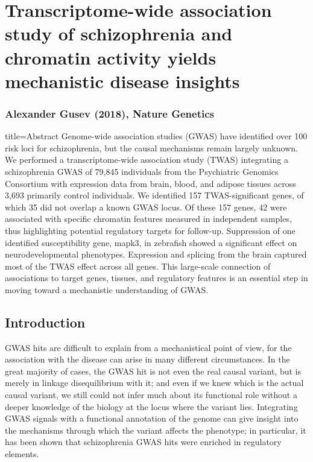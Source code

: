 \documentclass[../main.tex]{subfiles}
\begin{document}
\chapter[Transcriptome-wide association study of schizophrenia and 
chromatin activity]{Transcriptome-wide association study of 
	schizophrenia and chromatin activity yields mechanistic disease 
	insights}

\subsection{Alexander Gusev \etal (2018), Nature Genetics}

\begin{external_abstract}{title=Abstract}
Genome-wide association studies (GWAS) have identified over 100 risk 
loci for schizophrenia, but the causal mechanisms remain largely 
unknown. We performed a transcriptome-wide association study (TWAS) 
integrating a schizophrenia GWAS of 79,845 individuals from the 
Psychiatric Genomics Consortium with expression data from brain, blood, 
and adipose tissues across 3,693 primarily control individuals. We 
identified 157 TWAS-significant genes, of which 35 did not overlap a 
known GWAS locus. Of these 157 genes, 42 were associated with specific 
chromatin features measured in independent samples, thus highlighting 
potential regulatory targets for follow-up. Suppression of one 
identified susceptibility gene, mapk3, in zebrafish showed a significant 
effect on neurodevelopmental phenotypes. Expression and splicing from 
the brain captured most of the TWAS effect across all genes. This 
large-scale connection of associations to target genes, tissues, and 
regulatory features is an essential step in moving toward a mechanistic 
understanding of GWAS.
\end{external_abstract}

\section{Introduction}

GWAS hits are difficult to explain from a mechanistical point of view, 
for the association with the disease can arise in many different 
circumstances. In the great majority of cases, the GWAS hit is not even 
the real causal variant, but is merely in linkage disequilibrium with 
it; and even if we knew which is the actual causal variant, we still 
could not infer much about its functional role without a deeper 
knowledge of the biology at the locus where the variant lies. 
Integrating GWAS signals with a functional annotation of the genome can 
give insight into the mechanisms through which the variant affects the 
phenotype; in particular, it has been shown that schizophrenia GWAS hits 
were enriched in regulatory elements.
\end{document}
